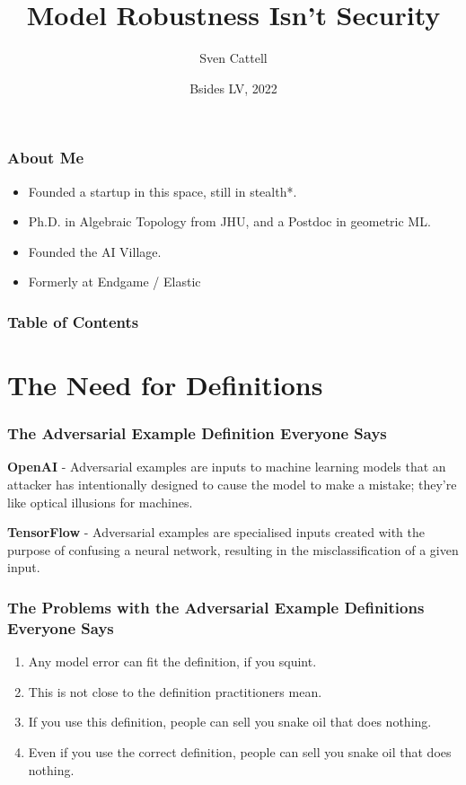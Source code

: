 \documentclass{beamer}
\title{Model Robustness Isn’t Security}
\author{Sven Cattell}
\date{Bsides LV, 2022}
\begin{document}
\frame{\titlepage}
\begin{frame}
\frametitle{About Me}
\begin{itemize}
\item Founded a startup in this space, still in stealth*.
\item Ph.D. in Algebraic Topology from JHU, and a Postdoc in geometric ML.
\item Founded the AI Village.
\item Formerly at Endgame / Elastic
\end{itemize}
\end{frame}

\begin{frame}
\frametitle{Table of Contents}
\tableofcontents
\end{frame}

\section{The Need for Definitions}

\begin{frame}
    \frametitle{The Adversarial Example Definition Everyone Says}
    \begin{definition}
        \textbf{OpenAI} - Adversarial examples are inputs to machine learning models that an attacker has intentionally designed to cause the model to make a mistake; they're like optical illusions for machines.
    \end{definition}
    \begin{definition}
        \textbf{TensorFlow} - Adversarial examples are specialised inputs created with the purpose of confusing a neural network, resulting in the misclassification of a given input.
    \end{definition}
\end{frame}

\begin{frame}
    \frametitle{The Problems with the Adversarial Example Definitions Everyone Says}
    \begin{enumerate}
        \item Any model error can fit the definition, if you squint.
        \item This is not close to the definition practitioners mean.
        \item If you use this definition, people can sell you snake oil that does nothing.
        \item Even if you use the correct definition, people can sell you snake oil that does nothing.
    \end{enumerate}
\end{frame}
\end{document}
